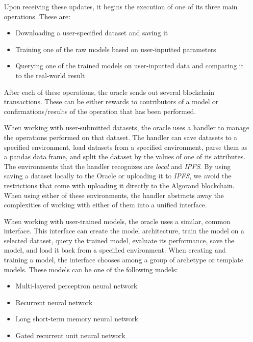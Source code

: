 \documentclass{ledger}
\begin{document}
Upon receiving these updates, it begins the execution of one of its three main operations.  These are:

\begin{itemize}
    \item Downloading a user-specified dataset and saving it
    \item Training one of the raw models based on user-inputted parameters
    \item Querying one of the trained models on user-inputted data and comparing it to the real-world result
\end{itemize}

After each of these operations, the oracle sends out several blockchain transactions.  These can be either rewards to
contributors of a model or confirmations/results of the operation that has been performed.

When working with user-submitted datasets, the oracle uses a handler to manage the operations performed on that dataset.
The handler can save datasets to a specified environment, load datasets from a specified environment, parse them as a
pandas data frame, and split the dataset by the values of one of its attributes.  The environments that the handler
recognizes are \textit{local} and \textit{IPFS}.  By using saving a dataset locally to the Oracle or uploading it to
\textit{IPFS}, we avoid the restrictions that come with uploading it directly to the Algorand blockchain.  When using
either of these environments, the handler abstracts away the complexities of working with either of them into a unified
interface.

When working with user-trained models, the oracle uses a similar, common interface.  This interface can create the model
architecture, train the model on a selected dataset, query the trained model, evaluate its performance, save the model,
and load it back from a specified environment.  When creating and training a model, the interface chooses among a group
of archetype or template models.  These models can be one of the following models:

\begin{itemize}
    \item Multi-layered perceptron neural network~\cite{preceptrons}
    \item Recurrent neural network~\cite{RNN}
    \item Long short-term memory neural network~\cite{LSTM}
    \item Gated recurrent unit neural network~\cite{GRU}
\end{itemize}
\end{document}
